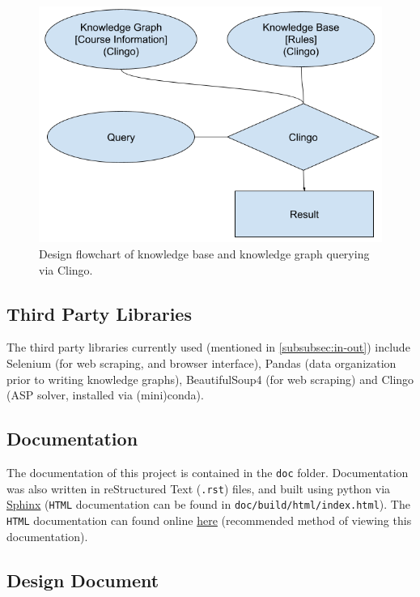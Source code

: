 \documentclass[12pt]{article}
\def \docLink{https://cse505.readthedocs.io/en/latest/?badge=latest}
\begin{document}
    \begin{figure}
        \centering
        \includegraphics[scale=0.5]{figures/design/kg_kb_query.png}
        \caption{Design flowchart of knowledge base and knowledge graph querying via Clingo.}
        \label{fig:kb-query}
    \end{figure}
    

    \subsection{Third Party Libraries}
    \label{subsec:thirdparty}

    The third party libraries currently used (mentioned in \ref{subsubsec:in-out}) include Selenium (for web scraping, and browser interface), Pandas (data organization prior to writing knowledge graphs), BeautifulSoup4 (for web scraping) and Clingo (ASP solver, installed via (mini)conda).

    \subsection{Documentation}
    \label{subsec:docs}

    The documentation of this project is contained in the {\tt{doc}} folder. Documentation was also written in reStructured Text ({\tt{.rst}}) files, and built using python via \href{https://www.sphinx-doc.org/en/master/}{Sphinx} ({\tt{HTML}} documentation can be found in {\tt{doc/build/html/index.html}}). The {\tt{HTML}} documentation can found online \href{\docLink}{here} (recommended method of viewing this documentation).

    \subsection{Design Document}
    \label{subsec:design-docs}
\end{document}
